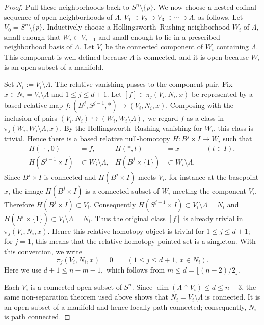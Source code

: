 \documentclass[12pt,oneside,a4paper]{article}
\theoremstyle{mytheorem}
\theoremstyle{remark}
\theoremstyle{definition}
\begin{document}
\begin{proof}
Pull these neighborhoods back to \(S^n\setminus\{p\}\). We now choose a nested
cofinal sequence of open neighborhoods of \(\Lambda\),
\(V_1\supset V_2\supset V_3\supset\cdots\supset \Lambda\),
as follows. Let \(V_0=S^n\setminus\{p\}\). Inductively choose a
Hollingsworth--Rushing neighborhood \(W_i\) of \(\Lambda\), small enough that
$W_i\subset V_{i-1}$
and small enough to lie in a prescribed neighborhood basis of \(\Lambda\). Let
\(V_i\) be the connected component of \(W_i\) containing \(\Lambda\). This
component is well defined because \(\Lambda\) is connected, and it is open
because \(W_i\) is an open subset of a manifold.

Set $N_i:=V_i\setminus\Lambda.$ The relative vanishing passes to the component pair. Fix
\(x\in N_i=V_i\setminus \Lambda\) and \(1\le j\le d+1\). Let
$[f]\in \pi_j(V_i,N_i,x)$ be represented by a based relative map
\(f\colon(B^j,S^{j-1},*)\to (V_i,N_i,x).\)
Composing with the inclusion of pairs $(V_i,N_i)\hookrightarrow (W_i,W_i\setminus \Lambda),$ we regard \(f\) as a class in
$\pi_j(W_i,W_i\setminus\Lambda,x).$
By the Hollingsworth--Rushing vanishing for \(W_i\), this class is trivial.
Hence there is a based relative null-homotopy
\(H\colon B^j\times I\to W_i\) such that
\[
\begin{aligned}
H(\,\cdot\,,0)&=f,
& H(*,t)&=x &&(t\in I),\\
H(S^{j-1}\times I)&\subset W_i\setminus\Lambda,
& H(B^j\times\{1\})&\subset W_i\setminus\Lambda.
\end{aligned}
\]
Since \(B^j \times I\) is connected and \(H(B^j \times I)\) meets \(V_i\), for instance at the basepoint \(x\), the image \(H(B^j \times I)\) is a connected subset of \(W_i\) meeting the component \(V_i\). Therefore $H(B^j\times I)\subset V_i.$
Consequently
\(H(S^{j-1}\times I)\subset V_i\setminus\Lambda=N_i\)
and
\(H(B^j\times\{1\})\subset V_i\setminus\Lambda=N_i\).
Thus the original class \([f]\) is already trivial in
\(\pi_j(V_i,N_i,x)\). Hence this relative homotopy object is trivial for
\(1\leq j\leq d+1\); for \(j=1\), this means that the relative homotopy
pointed set is a singleton. With this convention, we write
\[
\pi_j(V_i,N_i,x)=0
\qquad
(1\le j\le d+1,\ x\in N_i).
\]
Here we use $d+1\le n-m-1,$ which follows from \(m\le d=\lfloor(n-2)/2\rfloor\).

Each \(V_i\) is a connected open subset of \(S^n\). Since
\(\dim(\Lambda\cap V_i)\leq d\leq n-3\), the same non-separation theorem
used above shows that
\(N_i=V_i\setminus\Lambda\) is connected. It is an open subset of a
manifold and hence locally path connected; consequently, \(N_i\) is path
connected.



\end{proof}
\end{document}
